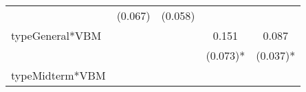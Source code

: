 \documentclass[12pt,twoside]{reedthesis}
\begin{document}
\begin{longtable}[]{@{}lcccc@{}}
\begin{minipage}[t]{0.14\columnwidth}
  \strut
  \end{minipage} & \begin{minipage}[t]{0.14\columnwidth}\centering\strut
  (0.067)\strut
  \end{minipage} & \begin{minipage}[t]{0.14\columnwidth}\centering\strut
  (0.058)\strut
  \end{minipage}\tabularnewline
  \begin{minipage}[t]{0.26\columnwidth}\raggedright\strut
  typeGeneral*VBM\strut
  \end{minipage} & \begin{minipage}[t]{0.12\columnwidth}\centering\strut
  \strut
  \end{minipage} & \begin{minipage}[t]{0.14\columnwidth}\centering\strut
  \strut
  \end{minipage} & \begin{minipage}[t]{0.14\columnwidth}\centering\strut
  0.151\strut
  \end{minipage} & \begin{minipage}[t]{0.14\columnwidth}\centering\strut
  0.087\strut
  \end{minipage}\tabularnewline
  \begin{minipage}[t]{0.26\columnwidth}\raggedright\strut
  \strut
  \end{minipage} & \begin{minipage}[t]{0.12\columnwidth}\centering\strut
  \strut
  \end{minipage} & \begin{minipage}[t]{0.14\columnwidth}\centering\strut
  \strut
  \end{minipage} & \begin{minipage}[t]{0.14\columnwidth}\centering\strut
  (0.073)*\strut
  \end{minipage} & \begin{minipage}[t]{0.14\columnwidth}\centering\strut
  (0.037)*\strut
  \end{minipage}\tabularnewline
  \begin{minipage}[t]{0.26\columnwidth}\raggedright\strut
  typeMidterm*VBM\strut
  \end{minipage} & \begin{minipage}[t]{0.12\columnwidth}\centering\strut
  \strut
  \end{minipage} & \begin{minipage}[t]{0.14\columnwidth}\centering\strut
  \strut
  \end{minipage} & \begin{minipage}[t]{0.14\columnwidth}\centering\strut

\end{minipage}
\end{longtable}
\end{document}
